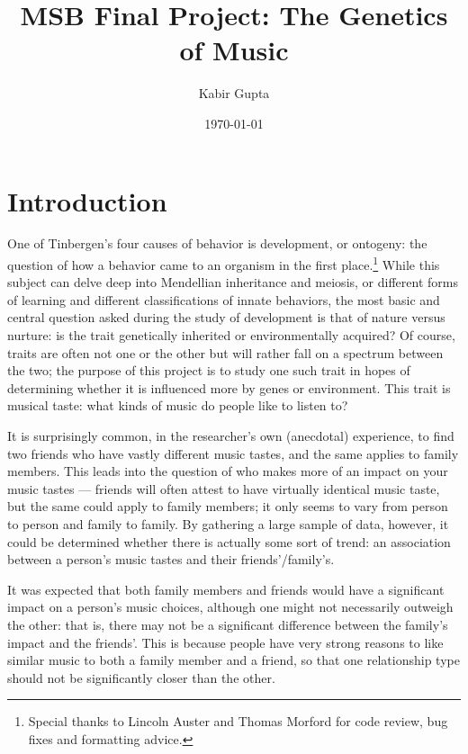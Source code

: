 \documentclass[12pt]{report}
\begin{document}
\title{MSB Final Project: The Genetics of Music}
\author{Kabir Gupta}
\date{\today}
\maketitle

\begin{NoHyper}
\tableofcontents
\end{NoHyper}

\chapter*{Introduction}
One of Tinbergen's four causes of behavior is development, or ontogeny: the question of how a behavior came to an organism in the first place.\footnote{Special thanks to Lincoln Auster and Thomas Morford for code review, bug fixes and formatting advice.} While this subject can delve deep into Mendellian inheritance and meiosis, or different forms of learning and different classifications of innate behaviors, the most basic and central question asked during the study of development is that of nature versus nurture: is the trait genetically inherited or environmentally acquired? Of course, traits are often not one or the other but will rather fall on a spectrum between the two; the purpose of this project is to study one such trait in hopes of determining whether it is influenced more by genes or environment. This trait is musical taste: what kinds of music do people like to listen to?

It is surprisingly common, in the researcher's own (anecdotal) experience, to find two friends who have vastly different music tastes, and the same applies to family members. This leads into the question of who makes more of an impact on your music tastes --- friends will often attest to have virtually identical music taste, but the same could apply to family members; it only seems to vary from person to person and family to family. By gathering a large sample of data, however, it could be determined whether there is actually some sort of trend: an association between a person's music tastes and their friends'/family's.

It was expected that both family members and friends would have a significant impact on a person's music choices, although one might not necessarily outweigh the other: that is, there may not be a significant difference between the family's impact and the friends'. This is because people have very strong reasons to like similar music to both a family member and a friend, so that one relationship type should not be significantly closer than the other.
\end{document}
